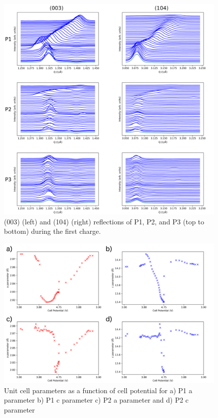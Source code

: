 \documentclass{article}
\begin{document}
\begin{figure}
  \includegraphics[width=\linewidth]{figures/ind-peaks.png}
  \caption{(003) (left) and (104) (right) reflections of P1, P2, and P3
    (top to bottom) during the first charge.}
  \label{fig:ind-peaks}
\end{figure}


\begin{figure}
  \includegraphics[width=\linewidth]{figures/cell-pars.png}
  \caption{Unit cell parameters as a function of cell potential for a)
  P1 a parameter b) P1 c parameter c) P2 a parameter and d) P2 c parameter}
  \label{fig:cell-pars}
\end{figure}
\end{document}
